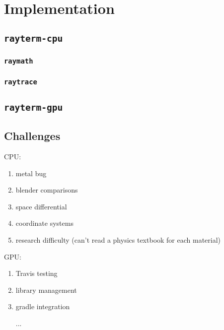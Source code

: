 %
%
%
\chapter{Implementation}\label{ch:implementation}

\section{\texttt{rayterm-cpu}}\label{ch:implementation:rayterm-cpu}

\subsection{\texttt{raymath}}\label{ch:implementation:rayterm-cpu:raymath}

\subsection{\texttt{raytrace}}\label{ch:implementation:rayterm-cpu:raytrace}


\section{\texttt{rayterm-gpu}}\label{ch:implementation:rayterm-cpu}

\section{Challenges}

CPU:
\begin{enumerate}
  \item metal bug
  \item blender comparisons
  \item space differential
  \item coordinate systems
  \item research difficulty (can't read a physics textbook for each material)
\end{enumerate}

GPU:
\begin{enumerate}
  \item Travis testing
  \item library management
  \item gradle integration
  \item [...]
\end{enumerate}
